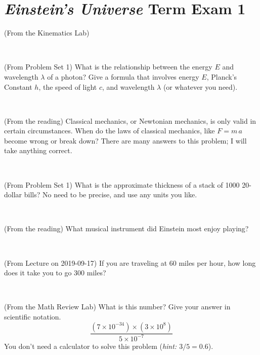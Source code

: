 \documentclass[12pt, letterpaper]{article}
\begin{document}
\section*{\textsl{Einstein's Universe} Term Exam 1}
\setcounter{problem}{1}


\begin{problem} (From the Kinematics Lab)

\end{problem}


\vfill ~

\begin{problem} (From Problem Set 1)
What is the relationship between the energy $E$ and wavelength
$\lambda$ of a photon? Give a formula that involves energy $E$,
Planck's Constant $h$, the speed of light $c$, and wavelength
$\lambda$ (or whatever you need).
\end{problem}

\vfill ~

\begin{problem} (From the reading)
Classical mechanics, or Newtonian mechanics, is only valid in certain
circumstances. When do the laws of classical mechanics, like $F =
m\,a$ become wrong or break down? There are many answers to this
problem; I will take anything correct.
\end{problem}


\vfill ~

\begin{problem} (From Problem Set 1)
What is the approximate thickness of a stack of 1000 20-dollar bills?
No need to be precise, and use any units you like.
\end{problem}


\vfill ~


\clearpage


\begin{problem} (From the reading)
What musical instrument did Einstein most enjoy playing?
\end{problem}


\vfill ~

\begin{problem} (From Lecture on 2019-09-17)
If you are traveling at 60 miles per hour, how long does
it take you to go 300 miles?
\end{problem}


\vfill ~

\begin{problem} (From the Math Review Lab)
What is this number? Give your answer in scientific notation.
$$
\frac{(7\times10^{-34})\times(3\times10^8)}{5\times10^{-7}}
$$
You don't need a calculator to solve this problem (\textit{hint: $3/5=0.6$}).
\end{problem}
\end{document}
